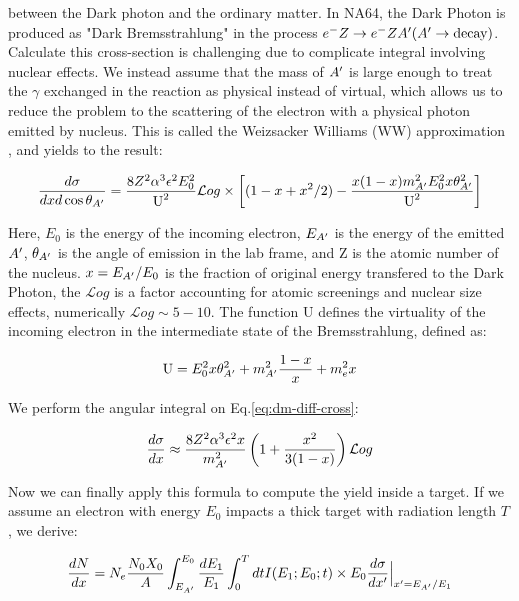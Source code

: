 between the Dark photon and the ordinary matter. In NA64, the Dark Photon is produced as "Dark Bremsstrahlung" in the process $e^- Z \to e^- Z A'(A' \to \textrm{decay})$. Calculate this cross-section is challenging due to complicate integral involving nuclear effects. We instead assume that the mass of $A'$ is large enough to treat the $\gamma$ exchanged in the reaction as physical instead of virtual, which allows us to reduce the problem to the scattering of the electron with a physical photon emitted by nucleus. This is called the Weizsacker Williams (WW) approximation \cite{Kim:1973he}, and yields to the result:

\begin{equation}
  \label{eq:dm-diff-cross}
  \frac{d\sigma}{dxd\cos{\theta_{A'}}} = \frac{8 Z^2 \alpha^3 \epsilon^2 E^2_0}{\textrm{U}^2} \mathcal{L}og \times \left[ (1 - x + x^2/2) - \frac{x(1-x)m^2_{A'}E^2_0 x \theta^2_{A'}}{\textrm{U}^2} \right]
\end{equation}

Here, $E_0$ is the energy of the incoming electron, $E_{A'}$ is the energy of the emitted $A'$, $\theta_{A'}$ is the angle of emission in the lab frame, and Z is the atomic number of the nucleus. $x=E_{A'}/E_0$ is the fraction of original energy transfered to the Dark Photon, the $\mathcal{L}og$ is a factor accounting for atomic screenings and nuclear size effects, numerically $\mathcal{L}og \sim 5 - 10$. The function U defines the virtuality of the incoming electron in the intermediate state of the Bremsstrahlung, defined as:

\begin{equation}
  \label{eq:u-func}
  \textrm{U} = E^2_0 x \theta^2_{A'} + m^2_{A'} \frac{1 - x}{x} + m^2_e x
\end{equation}

We perform the angular integral on Eq.\ref{eq:dm-diff-cross}:

\begin{equation}
  \label{eq:dm-diff-cross-int}
  \frac{d\sigma}{dx} \approx \frac{8 Z^2 \alpha^3 \epsilon^2 x}{m^2_{A'}} \left( 1 + \frac{x^2}{3(1-x)} \right) \mathcal{L}og 
\end{equation}

Now we can finally apply this formula to compute the yield inside a target. If we assume an electron with energy $E_0$ impacts a thick target with radiation length $T$, we derive:

\begin{equation}
  \label{eq:dm-general-yield}
  \frac{dN}{dx} = N_e \frac{N_0 X_0}{A} \int_{E_{A'}}^{E_0} \frac{dE_1}{E_1} \int_0^T dt I(E_1;E_0;t) \times E_0 \frac{d\sigma}{dx'}\Big|_{x' = E_{A'}/E_1}
\end{equation}

